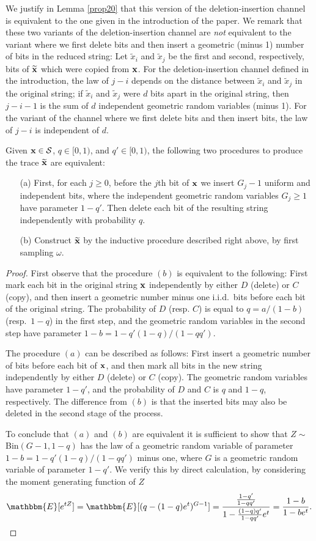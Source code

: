 \documentclass[final,12pt]{colt2018} %
\newcommand{\E}{\mathbbm{E}}
\newcommand{\1}{\mathbf{1}}
\def\cS{\mathcal{S}}
\def\cS{\mathcal{S}}
\newcommand{\eqbn}{\begin{equation*}}
\newcommand{\eqen}{\end{equation*}}
\newcommand{\wt}{\widetilde}
\def\xt{{\wt {\bf x}}}
\def\x{{\bf x}}
\begin{document}
We justify in Lemma \ref{prop20} that this version of the deletion-insertion channel is equivalent to the one given in the introduction of the paper. We remark that these two variants of the deletion-insertion channel are \emph{not} equivalent to the variant where we first delete bits and then insert a geometric (minus 1) number of bits in the reduced string: Let $\wt x_i$ and $\wt x_j$ be the first and second, respectively, bits of $\xt$ which were copied from $\x$. For the deletion-insertion channel defined in the introduction, the law of $j-i$ depends on the distance between $\wt x_i$ and $\wt x_j$ in the original string; if $\wt x_i$ and $\wt x_j$ were $d$ bits apart in the original string, then $j-i-1$ is the sum of $d$ independent geometric random variables (minus 1). For the variant of the channel where we first delete bits and then insert bits, the law of $j-i$ is independent of $d$.
\begin{lemma}\label{prop20}
	Given $\x\in\cS$, $q\in[0,1)$, and $q'\in[0,1)$, the following two procedures to produce the trace $\wt\x$ are equivalent:
	\begin{itemize}
		\item[(a)] First, for each $j\geq 0$, before the $j$th bit of $\x$ we insert $G_j-1$ uniform and
		independent bits, where the independent geometric random variables $G_j \ge 1 $ have parameter
		$1-q'$. Then delete each bit of the resulting string independently with probability $q$.
		\item[(b)] Construct $\wt\x$ by the inductive procedure described right above, by first sampling $\omega$.
	\end{itemize}
\end{lemma}
\begin{proof}
	First observe that the procedure $(b)$ is equivalent to the following: First mark each bit in the original string $\x$ independently by either $D$ (delete) or $C$ (copy), and then insert a geometric number minus one i.i.d.\ bits before each bit of the original string. The probability of $D$ (resp. $C$) is equal to $q=a/(1-b)$ (resp.\ $1-q$) in the first step, and the geometric random variables in the second step have parameter $1-b=1-q'(1-q)/(1-qq')$.
	
	The procedure $(a)$ can be described as follows: First insert a geometric number of bits before each bit of $\x$, and then mark all bits in the new string independently by either $D$ (delete) or $C$ (copy). The geometric random variables have parameter $1-q'$, and the probability of $D$ and $C$ is $q$ and $1-q$, respectively. The difference from $(b)$ is that the inserted bits may also be deleted in the second stage of the process.
	
	To conclude that $(a)$ and $(b)$ are equivalent it is sufficient to show that $Z\sim$ Bin$(G-1,1-q)$ has the law of a geometric random variable of parameter $1-b=1-q'(1-q)/(1-qq')$ minus one, where $G$ is a geometric random variable of parameter $1-q'$. We verify this by direct calculation, by considering the moment generating function of $Z$
	\eqbn
	\E[e^{tZ}] = \E[ (q-(1-q)e^t)^{G-1} ]=
	\frac{
		\frac{1-q'}{1-qq'}
	}
	{1-\frac{(1-q)q'}{1-qq'} e^t}
	=\frac{1-b}{1-be^t}.
	\eqen
\end{proof}
\end{document}
